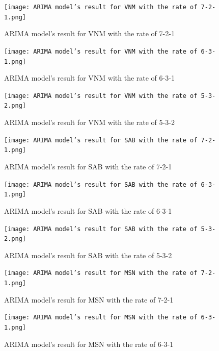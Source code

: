\documentclass{ieeeojies}
\begin{document}
    \begin{figure}[H]
    \centering
    \begin{minipage}{0.23\textwidth}
    \centering
    \texttt{[image: ARIMA model’s result for VNM with the rate of 7-2-1.png]}
    \caption{ARIMA model’s result for VNM with the rate of 7-2-1}
    \end{minipage}
    \hfill
    \begin{minipage}{0.23\textwidth}
    \centering
    \texttt{[image: ARIMA model’s result for VNM with the rate of 6-3-1.png]}
    \caption{ARIMA model’s result for VNM with the rate of 6-3-1}
    \end{minipage}
\end{figure}
\begin{figure}[H]
    \begin{minipage}{0.23\textwidth}
    \centering
    \texttt{[image: ARIMA model’s result for VNM with the rate of 5-3-2.png]}
    \caption{ARIMA model’s result for VNM with the rate of 5-3-2}
    \end{minipage}
    \hfill
    \begin{minipage}{0.23\textwidth}
    \centering
    \texttt{[image: ARIMA model’s result for SAB with the rate of 7-2-1.png]}
    \caption{ARIMA model’s result for SAB with the rate of 7-2-1}

    \end{minipage}
   \end{figure}

   \begin{figure}[H]
    \centering
    \begin{minipage}{0.23\textwidth}
    \centering
    \texttt{[image: ARIMA model’s result for SAB with the rate of 6-3-1.png]}
    \caption{ARIMA model’s result for SAB with the rate of 6-3-1}
    \end{minipage}
    \hfill
    \begin{minipage}{0.23\textwidth}
    \centering
    \texttt{[image: ARIMA model’s result for SAB with the rate of 5-3-2.png]}
    \caption{ARIMA model’s result for SAB with the rate of 5-3-2}
    \end{minipage}
    \end{figure}
    \begin{figure}[H]
    \begin{minipage}{0.23\textwidth}
    \centering
    \texttt{[image: ARIMA model’s result for MSN with the rate of 7-2-1.png]}
    \caption{ARIMA model’s result for MSN with the rate of 7-2-1}
    \end{minipage}
    \hfill
    \begin{minipage}{0.23\textwidth}
    \centering
    \texttt{[image: ARIMA model’s result for MSN with the rate of 6-3-1.png]}
    \caption{ARIMA model’s result for MSN with the rate of 6-3-1}
    \end{minipage}
   \end{figure}
\end{document}
